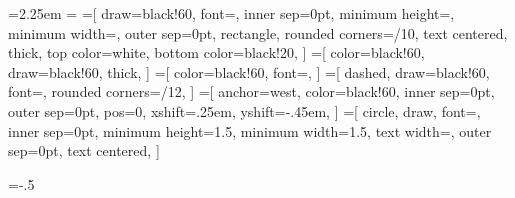 \usepackage[T1]{fontenc}
\usepackage{textcomp}
\usepackage[utf8]{inputenc}
\usepackage[english,brazilian]{babel}
\usepackage[protrusion=true,expansion]{microtype}
\usepackage{hyperref}
\hypersetup{colorlinks=true,allcolors=black}
\usepackage{amsmath}
\usepackage{mathtools}
\usepackage{float}
\usepackage{subfigure}
\usepackage{booktabs}
\usepackage{multicol}
\usepackage{multirow}
\usepackage{natbib}
\usepackage{paralist}
\setlength{\bibsep}{0.0pt}
\usepackage{tikz}
\usetikzlibrary{arrows,calc,positioning,shapes,trees}
\newdimen\hdim                  %
\newdimen\wdim                  %
\newdimen\odim                  %
\hdim=2.25em
\hdim
\odim=\hdim
{}=[
  draw=black!60,
  font={\scriptsize\sffamily},
  inner sep=0pt,
  minimum height=\hdim,
  minimum width=\wdim,
  outer sep=0pt,
  rectangle,
  rounded corners=\wdim/10,
  text centered,
  thick,
  top color=white,
  bottom color=black!20,
]
=[
  color=black!60,
  draw=black!60,
  thick,
]
=[
  color=black!60,
  font={\tiny\sffamily\bfseries},
]
=[
  dashed,
  draw=black!60,
  font={\tiny\sffamily\bfseries},
  rounded corners=\wdim/12,
]
=[
  anchor=west,
  color=black!60,
  inner sep=0pt,
  outer sep=0pt,
  pos=0,
  xshift=.25em,
  yshift=-.45em,
]
=[
  circle,
  draw,
  font={\scriptsize\sffamily},
  inner sep=0pt,
  minimum height=1.5\hdim,
  minimum width=1.5\hdim,
  text width=\hdim,
  outer sep=0pt,
  text centered,
]
\tikzset{
  node distance=\wdim+\odim,
  >=stealth,
  shorten >=.5pt,
}
\usepackage{listings}
\renewcommand{\lstlistingname}{Listagem}
\newdimen\xdim
\xdim=-.5\baselineskip
{}
\def\en#1{\foreignlanguage{english}{\emph{#1}}}
\let\C\lstinline
\def\<#1>{\ensuremath{\left<#1\right>}}

